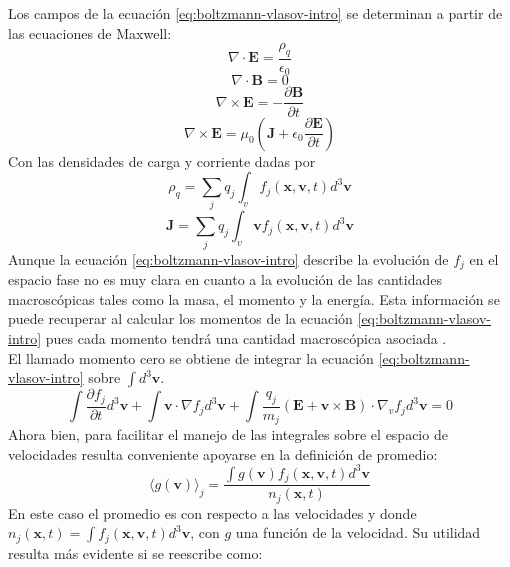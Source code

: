 \documentclass[../tesis_main_file.tex]{subfiles}
\begin{document}
Los campos de la ecuación \ref{eq:boltzmann-vlasov-intro} se determinan a partir de las ecuaciones de Maxwell:
\begin{equation}
\nabla \cdot \textbf{E}=\frac{\rho_q}{\epsilon _0}
\end{equation}
\begin{equation}
\nabla \cdot \textbf{B}=0
\end{equation}
\begin{equation}
\nabla \times \textbf{E}=-\frac{\partial \textbf{B}}{\partial t}
\end{equation}
\begin{equation}
\nabla \times \textbf{E} = \mu _0 \left(\textbf{J}+\epsilon_0\frac{\partial \textbf{E}}{\partial t} \right)
\end{equation}
Con las densidades de carga y corriente dadas por
\begin{equation}
\rho_q = \sum_j q_j \int_v f_j(\textbf{x},\textbf{v},t) d^3 \textbf{v}
\end{equation}
\begin{equation}
\textbf{J}= \sum_j q_j \int_v \textbf{v}f_j(\textbf{x},\textbf{v},t) d^3 \textbf{v}
\end{equation}
Aunque la ecuación \ref{eq:boltzmann-vlasov-intro} describe la evolución de $f_j$ en el espacio fase no es muy clara en cuanto a la evolución de las cantidades macroscópicas tales como la masa, el momento y la energía.
Esta información se puede recuperar al calcular los momentos de la ecuación \ref{eq:boltzmann-vlasov-intro} pues cada momento tendrá una cantidad macroscópica asociada .\\
El llamado momento cero se obtiene de integrar la ecuación \ref{eq:boltzmann-vlasov-intro} sobre $\int d^3 \textbf{v}$.
\begin{equation}
 \int \frac{\partial f_j}{\partial t}d^3 \textbf{v}+ \int \textbf{v}\cdot \nabla f_j d^3 \textbf{v} + \int \frac{q_j}{m_j}\left( \textbf{E} + \textbf{v} \times \textbf{B}\right)\cdot \nabla _v f_j d^3 \textbf{v}=0
\end{equation}
Ahora bien, para facilitar el manejo de las integrales sobre el espacio de velocidades resulta conveniente apoyarse en la definición de promedio:
\begin{equation}
\langle g(\textbf{v}) \rangle _j = \frac{\int g(\textbf{v})f_j(\textbf{x},\textbf{v},t)d^3\textbf{v}}{n_j(\textbf{x},t)}
\end{equation}
En este caso el promedio es con respecto a las velocidades y donde $n_j(\textbf{x},t)=\int f_j(\textbf{x},\textbf{v},t) d^3\textbf{v}$, con $g$ una función de la velocidad. Su utilidad resulta más evidente si se reescribe como:
\end{document}
